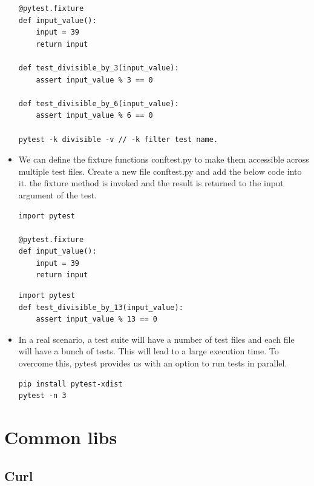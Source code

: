 \documentclass[a4paper,11pt,twoside]{book}
\begin{document}
\begin{itemize}
\begin{lstlisting}
@pytest.fixture
def input_value():
	input = 39
	return input

def test_divisible_by_3(input_value):
	assert input_value % 3 == 0

def test_divisible_by_6(input_value):
	assert input_value % 6 == 0	

pytest -k divisible -v // -k filter test name.
\end{lstlisting}

	\item We can define the fixture functions conftest.py to make them accessible across multiple test files. Create a new file conftest.py and add the below code into it. the fixture method is invoked and the result is returned to the input argument of the test.
\begin{lstlisting}
import pytest

@pytest.fixture 
def input_value():
	input = 39
	return input
\end{lstlisting}

\begin{lstlisting}
import pytest
def test_divisible_by_13(input_value):
	assert input_value % 13 == 0
\end{lstlisting}

	\item In a real scenario, a test suite will have a number of test files and each file will have a bunch of tests. This will lead to a large execution time. To overcome this, pytest provides us with an option to run tests in parallel.

\begin{lstlisting}
pip install pytest-xdist
pytest -n 3
\end{lstlisting}

\end{itemize}


\chapter{Common libs}
\section{Curl}
\end{document}
